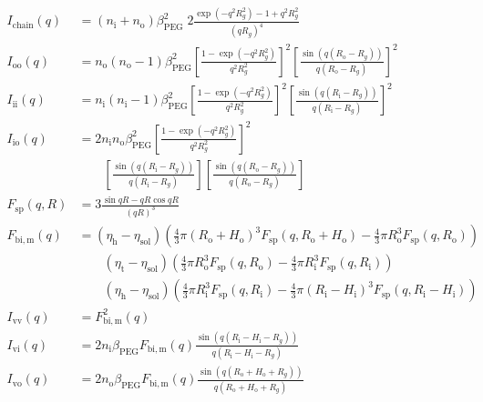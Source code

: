 \begin{align}
 I_\mathrm{chain}(q) &= (n_\mathrm{i}+n_\mathrm{o})\beta_\mathrm{PEG}^2 \; 2 \frac{\exp\left(-q^2R_g^2\right)-1+q^2R_g^2}{(qR_g)^4} \label{eq:vesiclePEG7chain}\\
 I_\mathrm{oo}(q) &= n_\mathrm{o}(n_\mathrm{o}-1)\beta_\mathrm{PEG}^2 \left[\frac{1-\exp\left(-q^2R_g^2\right)}{q^2R_g^2}\right]^2\left[\frac{\sin\left(q(R_\mathrm{o}-R_g)\right)}{q(R_\mathrm{o}-R_g)}\right]^2 \label{eq:vesiclePEG7oo}\\
 I_\mathrm{ii}(q) &=  n_\mathrm{i}(n_\mathrm{i}-1)\beta_\mathrm{PEG}^2 \left[\frac{1-\exp\left(-q^2R_g^2\right)}{q^2R_g^2}\right]^2\left[\frac{\sin\left(q(R_\mathrm{i}-R_g)\right)}{q(R_\mathrm{i}-R_g)}\right]^2 \label{eq:vesiclePEG7ii}\\
  I_\mathrm{io}(q) &= 2 n_\mathrm{i}n_\mathrm{o}\beta_\mathrm{PEG}^2 \left[\frac{1-\exp\left(-q^2R_g^2\right)}{q^2R_g^2}\right]^2 \nonumber \\
  &\qquad \left[\frac{\sin\left(q(R_\mathrm{i}-R_g)\right)}{q(R_\mathrm{i}-R_g)}\right] \left[\frac{\sin\left(q(R_\mathrm{o}-R_g)\right)}{q(R_\mathrm{o}-R_g)}\right]
 \label{eq:vesiclePEG7io}\\
 F_\mathrm{sp}(q,R) &= 3\frac{\sin qR - qR\cos qR}{(qR)^3}  \\
 F_\mathrm{bi,m}(q) &= (\eta_\mathrm{h}-\eta_\mathrm{sol})\left( \frac43\pi (R_\mathrm{o}+H_\mathrm{o})^3 F_\mathrm{sp}(q,R_\mathrm{o}+H_\mathrm{o}) -  \frac43\pi R_\mathrm{o}^3 F_\mathrm{sp}(q,R_\mathrm{o}) \right) \nonumber \\
 & \qquad (\eta_\mathrm{t}-\eta_\mathrm{sol}) \left(\frac43\pi R_\mathrm{o}^3 F_\mathrm{sp}(q,R_\mathrm{o}) - \frac43\pi R_\mathrm{i}^3 F_\mathrm{sp}(q,R_\mathrm{i}) \right) \\
 & \qquad (\eta_\mathrm{h}-\eta_\mathrm{sol}) \left(\frac43\pi R_\mathrm{i}^3 F_\mathrm{sp}(q,R_\mathrm{i}) - \frac43\pi (R_\mathrm{i}-H_\mathrm{i})^3 F_\mathrm{sp}(q,R_\mathrm{i}-H_\mathrm{i})\right) \nonumber \\
 I_\mathrm{vv}(q) &= F_\mathrm{bi,m}^2(q) \label{eq:vesiclePEG7vv} \\
 I_\mathrm{vi}(q) &= 2 n_\mathrm{i}\beta_\mathrm{PEG} F_\mathrm{bi,m}(q) \frac{\sin\left(q(R_\mathrm{i}-H_\mathrm{i}-R_g)\right)}{q(R_\mathrm{i}-H_\mathrm{i}-R_g)} \label{eq:vesiclePEG7vi} \\
 I_\mathrm{vo}(q) &= 2 n_\mathrm{o}\beta_\mathrm{PEG} F_\mathrm{bi,m}(q) \frac{\sin\left(q(R_\mathrm{o}+H_\mathrm{o}+R_g)\right)}{q(R_\mathrm{o}+H_\mathrm{o}+R_g)} \label{eq:vesiclePEG7vo} \\
\end{align}
